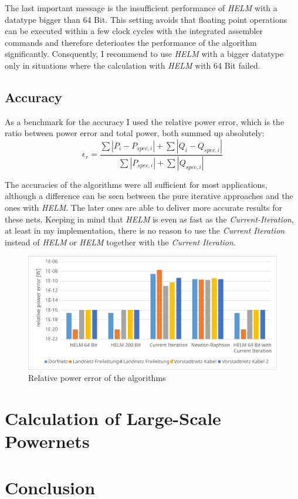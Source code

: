 The last important message is the insufficient performance of \emph{HELM} with a datatype bigger than 64 Bit. This setting avoids that floating point operations can be executed within a few clock cycles with the integrated assembler commands and therefore deterioates the performance of the algorithm significantly. Consquently, I recommend to use \emph{HELM} with a bigger datatype only in situations where the calculation with \emph{HELM} with 64 Bit failed.

\subsection{Accuracy}

As a benchmark for the accuracy I used the relative power error, which is the ratio between power error and total power, both summed up absolutely:
\begin{equation}
	\epsilon_r = \frac{\sum |P_i - P_{spec,i}| + \sum |Q_i - Q_{spec,i}|}{\sum |P_{spec,i}| + \sum |Q_{spec,i}|}
\end{equation}

The accuracies of the algorithms  were all sufficient for most applications, although a difference can be seen between the pure iterative approaches and the ones with \emph{HELM}. The later ones are able to deliver more accurate results for these nets. Keeping in mind that \emph{HELM} is even as fast as the \emph{Current-Iteration}, at least in my implementation, there is no reason to use the \emph{Current Iteration} instead of \emph{HELM} or \emph{HELM} together with the \emph{Current Iteration}.

\begin{figure}
	\centering
	\includegraphics[scale=0.7]{figures/comparison_accuracy}
	\caption[Comparison, accuracy]{Relative power error of the algorithms}
	\label{fig:comparison_accuracy}
\end{figure}

\section{Calculation of Large-Scale Powernets}
\label{sec:large_scale_powernets}

\section{Conclusion}